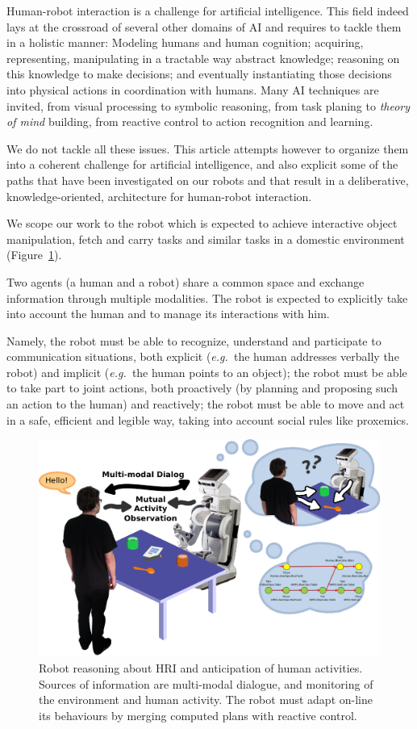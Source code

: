 \documentclass[preprint,3p,times]{elsarticle}
\newcommand{\eg}{{\textit{e.g.\ }}}
\begin{document}
Human-robot interaction is a challenge for artificial intelligence. This field
indeed lays at the crossroad of several other domains of AI and requires to
tackle them in a holistic manner: Modeling humans and human cognition;
acquiring, representing, manipulating in a tractable way abstract knowledge;
reasoning on this knowledge to make decisions; and eventually instantiating
those decisions into physical actions in coordination with humans. Many AI
techniques are invited, from visual processing to symbolic reasoning, from task
planing to \emph{theory of mind} building, from reactive control to action
recognition and learning.

We do not tackle all these issues. This article attempts however to organize
them into a coherent challenge for artificial intelligence, and also explicit
some of the paths that have been investigated on our robots and that result in a
deliberative, knowledge-oriented, architecture for human-robot interaction.


We scope our work to the robot which is
expected to achieve interactive object manipulation, fetch and carry tasks and
similar tasks in a domestic environment (Figure~\ref{fig:hri-dec}).

Two agents (a human and a robot) share a common space and exchange information
through multiple modalities. The robot is expected to explicitly take into
account the human and to manage its interactions with him.

Namely, the robot must be able to recognize, understand and participate
to communication situations, both explicit (\eg the human addresses verbally
the robot) and implicit (\eg the human points to an object); the robot must be
able to take part to joint actions, both proactively (by planning and proposing
such an action to the human) and reactively; the robot must be able to move and
act in a safe, efficient and legible way, taking into account social rules like
proxemics.

\begin{figure}[htb]
\centering
\includegraphics[width=0.9\columnwidth]{grounding_robot.pdf}
\caption{Robot reasoning about HRI and anticipation of human activities.
  Sources of information are multi-modal dialogue, and monitoring of the
  environment and human activity. The robot must adapt on-line its behaviours
  by merging computed plans with reactive control.}
\label{fig:hri-dec}
\end{figure}
\end{document}
